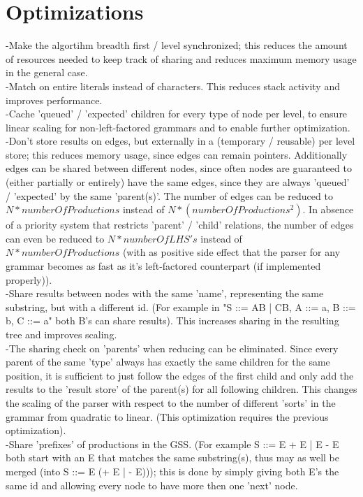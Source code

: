 \documentclass[a4paper,10pt]{article}
\begin{document}
\section{Optimizations}

-Make the algortihm breadth first / level synchronized; this reduces the amount of resources needed to keep track of sharing and reduces maximum memory usage in the general case.\\
-Match on entire literals instead of characters. This reduces stack activity and improves performance.\\
-Cache 'queued' / 'expected' children for every type of node per level, to ensure linear scaling for non-left-factored grammars and to enable further optimization.\\
-Don't store results on edges, but externally in a (temporary / reusable) per level store; this reduces memory usage, since edges can remain pointers. Additionally edges can be shared between different nodes, since often nodes are guaranteed to (either partially or entirely) have the same edges, since they are always 'queued' / 'expected' by the same 'parent(s)'. The number of edges can be reduced to $N * numberOfProductions$ instead of $N * (numberOfProductions^{2})$. In absence of a priority system that restricts 'parent' / 'child' relations, the number of edges can even be reduced to $N * numberOfLHS's$ instead of $N * numberOfProductions$ (with as positive side effect that the parser for any grammar becomes as fast as it's left-factored counterpart (if implemented properly)).\\
-Share results between nodes with the same 'name', representing the same substring, but with a different id. (For example in "S ::= AB | CB, A ::= a, B ::= b, C ::= a" both B's can share results). This increases sharing in the resulting tree and improves scaling.\\
-The sharing check on 'parents' when reducing can be eliminated. Since every parent of the same 'type' always has exactly the same children for the same position, it is sufficient to just follow the edges of the first child and only add the results to the 'result store' of the parent(s) for all following children. This changes the scaling of the parser with respect to the number of different 'sorts' in the grammar from quadratic to linear. (This optimization requires the previous optimization).\\
-Share 'prefixes' of productions in the GSS. (For example S ::= E + E | E - E both start with an E that matches the same substring(s), thus may as well be merged (into S ::= E (+ E | - E))); this is done by simply giving both E's the same id and allowing every node to have more then one 'next' node.\\
\end{document}
